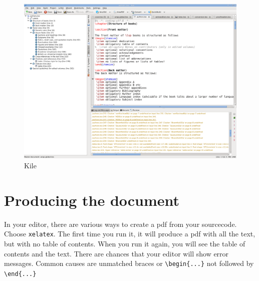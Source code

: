 \begin{figure}
\includegraphics[width=\textwidth]{kile.png}
\caption{Kile}
\label{fig:latex:kile} 
\end{figure}

  
% 
\section{Producing the document}
In your \latex editor, there are various ways to create a pdf from your sourcecode. Choose \verb+xelatex+. The first time you run it, it will produce a pdf with all the text, but with no table of contents. When you run it again, you will see the table of contents and the text. There are chances that your editor will show error messages. Common causes are unmatched braces or \verb+\begin{...}+ not followed by \verb+\end{...}+

